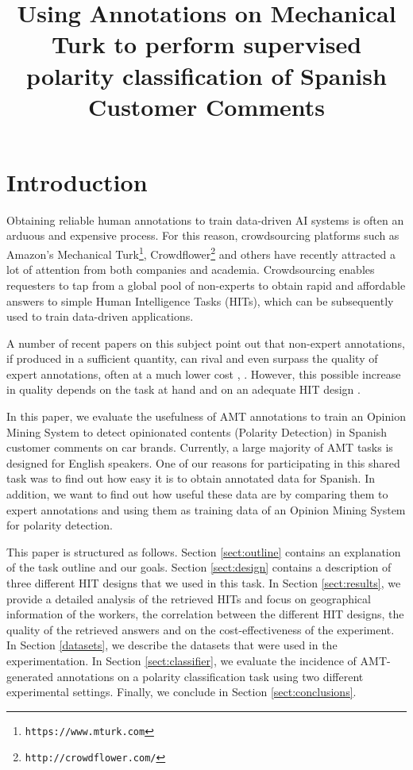 \documentclass[11pt, a4paper,onecolumn]{article}
\title{Using Annotations on Mechanical Turk to perform supervised polarity classification of Spanish Customer Comments}
\begin{document}
\maketitleabstract

\section{Introduction}
\label{sec:intro}


Obtaining reliable human annotations to train data-driven AI systems is often an arduous and expensive process. For this reason, crowdsourcing platforms such as Amazon's Mechanical Turk\footnote{\texttt{https://www.mturk.com}}, Crowdflower\footnote{\texttt{http://crowdflower.com/}} and others have recently attracted a lot of attention from both companies and academia. Crowdsourcing enables requesters to tap from a global pool of non-experts to obtain rapid and affordable answers to simple Human Intelligence Tasks (HITs), which can be subsequently used to train data-driven applications.

A number of recent papers on this subject point out that non-expert annotations, if produced in a sufficient quantity, can rival and even surpass the quality of expert annotations, often at a much lower cost \cite{snow_cheap_2008}, \cite{su_internet-scale_2007}. However, this possible increase in quality depends on the task at hand and on an adequate HIT design \cite{kittur_crowdsourcing_2008}. 

In this paper, we evaluate the usefulness of AMT annotations to train an Opinion Mining System to detect opinionated contents (Polarity Detection) in Spanish customer comments on car brands. Currently, a large majority of AMT tasks is designed for English speakers. One of our reasons for participating in this shared task was to find out how easy it is to obtain annotated data for Spanish. In addition, we want to find out how useful these data are by comparing them to expert annotations and using them as training data of an Opinion Mining System for polarity detection.

This paper is structured as follows. Section \ref{sect:outline} contains an explanation of the task outline and our goals. Section \ref{sect:design} contains a description of three different HIT designs that we used in this task. In Section \ref{sect:results}, we provide a detailed analysis of the retrieved HITs and focus on geographical information of the workers, the correlation between the different HIT designs, the quality of the retrieved answers and on the cost-effectiveness of  the experiment. In Section \ref{datasets}, we describe the datasets that were used in the experimentation. In Section \ref{sect:classifier}, we evaluate the incidence of AMT-generated annotations on a polarity classification task using two different experimental settings. Finally, we conclude in Section \ref{sect:conclusions}.
\end{document}

